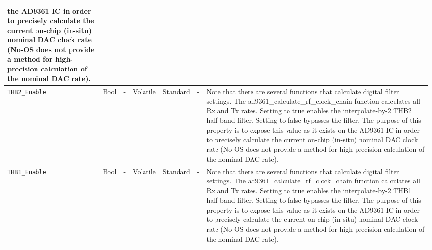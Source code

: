\documentclass{article}
\begin{document}
\begin{landscape}
\begin{scriptsize}
\begin{longtable}{|p{3.6cm}|p{8.1cm}|p{1.4cm}|p{1.3cm}|p{1.4cm}|p{2.5cm}|p{3.6cm}|}
                                            the AD9361 IC in order to precisely
                                            calculate the current on-chip
                                            (in-situ) nominal DAC clock rate
                                            (No-OS does not provide a method for
                                            high-precision calculation of the
                                            nominal DAC rate). \\
			\hline
			\verb+THB2_Enable+ & Bool & - & Volatile & Standard & - &
                               Note that there are several
                                 functions that calculate digital filter
                                 settings. The ad9361\_calculate\_rf\_clock\_chain
                                 function calculates all Rx and Tx rates.
                                 Setting to true enables the interpolate-by-2
                                 THB2 half-band filter. Setting to false
                                 bypasses the filter. The purpose of this
                                 property is to expose this value as it exists
                                 on the AD9361 IC in order to precisely
                                 calculate the current on-chip (in-situ) nominal
                                 DAC clock rate (No-OS does not provide a method
                                 for high-precision calculation of the nominal
                                 DAC rate). \\
			\hline
			\verb+THB1_Enable+ & Bool & - & Volatile & Standard & - &
                               Note that there are several
                                 functions that calculate digital filter
                                 settings. The ad9361\_calculate\_rf\_clock\_chain
                                 function calculates all Rx and Tx rates.
                                 Setting to true enables the interpolate-by-2
                                 THB1 half-band filter. Setting to false
                                 bypasses the filter. The purpose of this
                                 property is to expose this value as it exists
                                 on the AD9361 IC in order to precisely
                                 calculate the current on-chip (in-situ) nominal
                                 DAC clock rate (No-OS does not provide a method
                                 for high-precision calculation of the nominal
                                 DAC rate). \\

\end{longtable}
\end{scriptsize}
\end{landscape}
\end{document}
